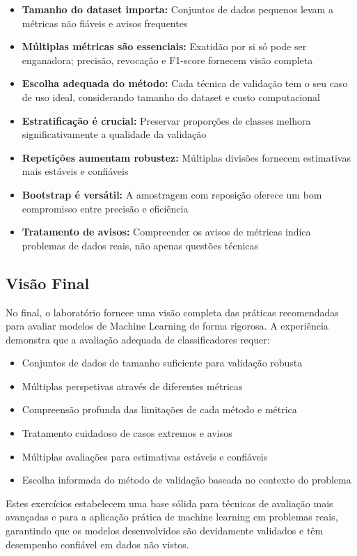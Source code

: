 \documentclass[12pt,a4paper]{article}
\begin{document}
\begin{itemize}
    \item \textbf{Tamanho do dataset importa:} Conjuntos de dados pequenos levam a métricas não fiáveis e avisos frequentes
    
    \item \textbf{Múltiplas métricas são essenciais:} Exatidão por si só pode ser enganadora; precisão, revocação e F1-score fornecem visão completa
    
    \item \textbf{Escolha adequada do método:} Cada técnica de validação tem o seu caso de uso ideal, considerando tamanho do dataset e custo computacional
    
    \item \textbf{Estratificação é crucial:} Preservar proporções de classes melhora significativamente a qualidade da validação
    
    \item \textbf{Repetições aumentam robustez:} Múltiplas divisões fornecem estimativas mais estáveis e confiáveis
    
    \item \textbf{Bootstrap é versátil:} A amostragem com reposição oferece um bom compromisso entre precisão e eficiência
    
    \item \textbf{Tratamento de avisos:} Compreender os avisos de métricas indica problemas de dados reais, não apenas questões técnicas
\end{itemize}

\subsection{Visão Final}

No final, o laboratório fornece uma visão completa das práticas recomendadas para avaliar modelos de Machine Learning de forma rigorosa. A experiência demonstra que a avaliação adequada de classificadores requer:

\begin{itemize}
    \item Conjuntos de dados de tamanho suficiente para validação robusta
    \item Múltiplas perspetivas através de diferentes métricas
    \item Compreensão profunda das limitações de cada método e métrica
    \item Tratamento cuidadoso de casos extremos e avisos
    \item Múltiplas avaliações para estimativas estáveis e confiáveis
    \item Escolha informada do método de validação baseada no contexto do problema
\end{itemize}

Estes exercícios estabelecem uma base sólida para técnicas de avaliação mais avançadas e para a aplicação prática de machine learning em problemas reais, garantindo que os modelos desenvolvidos são devidamente validados e têm desempenho confiável em dados não vistos.
\end{document}

